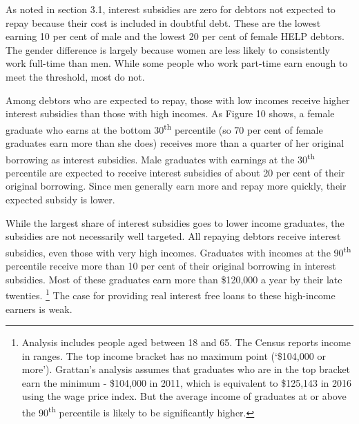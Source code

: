 \documentclass[embargoed]{grattan}
\begin{document}
As noted in section 3.1, interest subsidies are zero for debtors not expected to repay because their cost is included in doubtful debt.
These are the lowest earning 10 per cent of male and the lowest 20 per cent of female HELP debtors.
The gender difference is largely because women are less likely to consistently work full-time than men.
While some people who work part-time earn enough to meet the threshold, most do not.

Among debtors who are expected to repay, those with low incomes receive higher interest subsidies than those with high incomes.
As Figure 10 shows, a female graduate who earns at the bottom 30\textsuperscript{th} percentile (so 70 per cent of female graduates earn more than she does) receives more than a quarter of her original borrowing as interest subsidies.
Male graduates with earnings at the 30\textsuperscript{th} percentile are expected to receive interest subsidies of about 20 per cent of their original borrowing.
Since men generally earn more and repay more quickly, their expected subsidy is lower.

While the largest share of interest subsidies goes to lower income graduates, the subsidies are not necessarily well targeted.
All repaying debtors receive interest subsidies, even those with very high incomes.
Graduates with incomes at the 90\textsuperscript{th} percentile receive more than 10 per cent of their original borrowing in interest subsidies.
Most of these graduates earn more than \$120,000 a year by their late twenties.%
\footnote{Analysis includes people aged between 18 and 65.
The Census reports income in ranges.
The top income bracket has no maximum point (`\$104,000 or more').
Grattan's analysis assumes that graduates who are in the top bracket earn the minimum - \$104,000 in 2011, which is equivalent to \$125,143 in 2016 using the wage price index.
But the average income of graduates at or above the 90\textsuperscript{th} percentile is likely to be significantly higher.} The case for providing real interest free loans to these high-income earners is weak.
\end{document}
